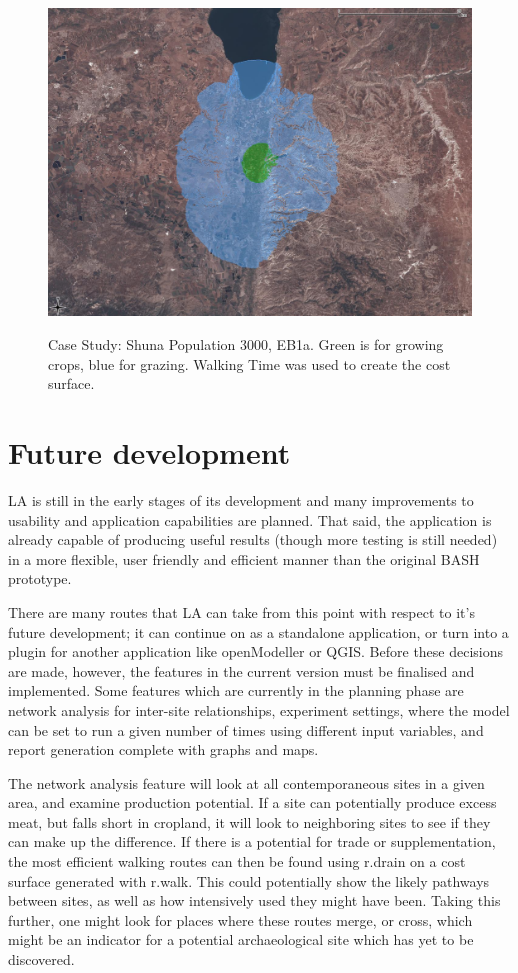   \begin{figure}[htbp] %
  \includegraphics[scale=0.225]{./images/LEB130007030FallowSlope.jpg}
  \label{fig:caseStudy} \caption{Case Study: Shuna  Population 3000, EB1a. 
Green is for growing crops, blue for grazing.  Walking Time was used to create
the cost surface.}
  \end{figure}

\section{Future development} \label{FuturePlans} 

LA is still in the early stages of its development and many
improvements to usability and application capabilities are planned. That said,
the application is already capable of producing useful results (though more
testing is still needed) in a more flexible, user friendly and efficient manner
than the original BASH prototype.

There are many routes that LA can take from this point with
respect to it's future development; it can continue on as a standalone
application, or turn into a plugin for another application like openModeller or
QGIS.  Before these decisions are made, however, the features in the current
version must be finalised and implemented.  Some features which are currently
in the planning phase are network analysis  for inter-site relationships,
experiment settings, where the model can be set to run a given number of times
using different input variables, and report generation complete with graphs and
maps. 

The network analysis feature will look at all contemporaneous sites in a given
area, and examine production potential.  If a site can potentially produce
excess meat, but falls short in cropland, it will look to neighboring sites to
see if they can make up the difference.  If there is a potential for trade or
supplementation, the most efficient walking routes can then be found using
r.drain on a cost surface generated with r.walk.  This could potentially show
the likely pathways between sites, as well as how intensively used they might
have been.  Taking this further, one might look for places where these routes
merge, or cross, which might be an indicator for a potential archaeological
site which has yet to be discovered.

